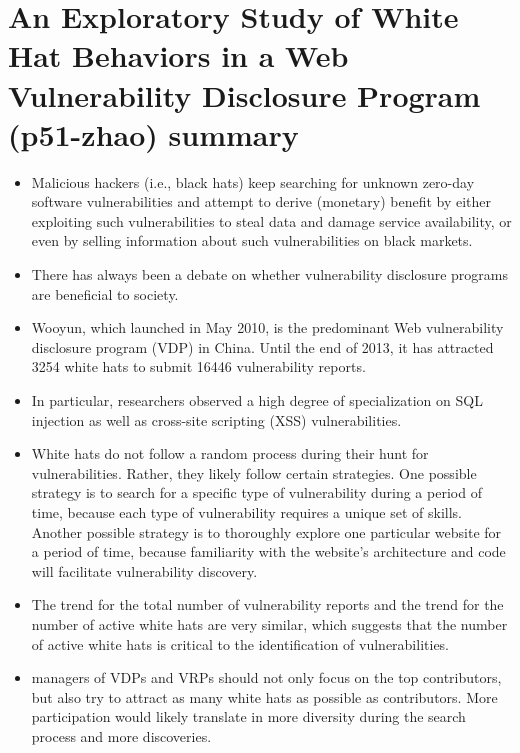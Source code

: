 \documentclass[14pt]{article}
\begin{document}
	\section{An Exploratory Study of White Hat Behaviors in a Web Vulnerability Disclosure Program (p51-zhao) summary}
	\begin{itemize}
	\item Malicious hackers (i.e., black hats) keep searching for unknown zero-day software vulnerabilities and attempt to derive (monetary) beneﬁt by either exploiting such vulnerabilities to steal data and damage service availability, or even by selling information about such vulnerabilities on black markets.
	\item There has always been a debate on whether vulnerability disclosure programs are beneﬁcial to society.
	\item Wooyun, which launched in May 2010, is the predominant Web vulnerability disclosure program (VDP) in China. Until the end of 2013, it has attracted 3254 white hats to submit 16446 vulnerability reports.
	\item In particular, researchers observed a high degree of specialization on SQL injection as well as cross-site scripting (XSS) vulnerabilities.
	\item White hats do not follow a random process during their hunt for vulnerabilities. Rather, they likely follow certain strategies. One possible strategy is to search for a speciﬁc type of vulnerability during a period of time, because each type of vulnerability requires a unique set of skills. Another possible strategy is to thoroughly explore one particular website for a period of time, because familiarity with the website’s architecture and code will facilitate vulnerability discovery.
	\item The trend for the total number of vulnerability reports and the trend for the number of active white hats are very similar, which suggests that the number of active white hats is critical to the identiﬁcation of vulnerabilities.
	\item managers of VDPs and VRPs should not only focus on the top contributors, but also try to attract as many white hats as possible as contributors. More participation would likely translate in more diversity during the search process and more discoveries.
	\end{itemize}
\end{document}
